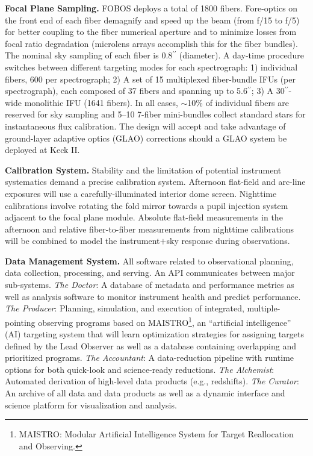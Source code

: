\documentclass[oneside,11pt]{amsart}
\newcommand{\arcsec}{\mbox{$^{\prime\prime}$}}
\begin{document}
\noindent \textbf{Focal Plane Sampling.} FOBOS deploys a total of 1800 fibers.  Fore-optics on the front end of each fiber demagnify and speed up the beam (from f/15 to f/5) for better
coupling to the fiber numerical aperture and to minimize losses from focal ratio degradation (microlens arrays accomplish this for the fiber bundles).  The nominal sky sampling
of each fiber is 0.8\arcsec{} (diameter).  A day-time procedure switches between different targeting modes for each
spectrograph: 1) individual fibers, 600 per spectrograph; 2) A set of 15 multiplexed fiber-bundle IFUs (per
spectrograph), each composed of 37 fibers and spanning up to 5.6\arcsec{}; 3) A 30\arcsec{}-wide monolithic IFU (1641
fibers).  In all cases, $\sim$10\% of individual fibers are reserved for sky sampling and 5--10 7-fiber mini-bundles
collect standard stars for instantaneous flux calibration.  The design will accept and take advantage of ground-layer adaptive optics (GLAO) corrections should a GLAO system be deployed at Keck II.


\noindent \textbf{Calibration System.} Stability and the limitation of potential instrument systematics demand a
precise calibration system.  Afternoon flat-field and arc-line exposures will use a carefully-illuminated interior dome
screen.  Nighttime calibrations involve rotating the fold mirror towards a pupil injection system adjacent to the focal
plane module.  Absolute flat-field measurements in the afternoon and relative fiber-to-fiber measurements from
nighttime calibrations will be combined to model the instrument$+$sky response during observations.

\noindent \textbf{Data Management System.} All software related to observational planning, data collection, processing, and serving.  An API communicates between major sub-systems.  \emph{The Doctor}: A database of metadata and performance metrics as well as analysis software to monitor instrument health and predict performance.  \emph{The Producer}: Planning, simulation, and execution of integrated, multiple-pointing observing programs based on MAISTRO\footnote{MAISTRO: Modular
Artificial Intelligence System for Target Reallocation and Observing.}, an ``artificial intelligence'' (AI) targeting
system that will learn optimization strategies for assigning targets defined by the Lead Observer as well as a database
containing overlapping and prioritized programs.  \emph{The Accountant}: A data-reduction pipeline with runtime options
for both quick-look and science-ready reductions. \emph{The Alchemist}: Automated derivation of high-level data products (e.g.,
redshifts). \emph{The Curator}: An archive of all data and data products as well as a dynamic interface and
science platform for visualization and analysis.
\end{document}

